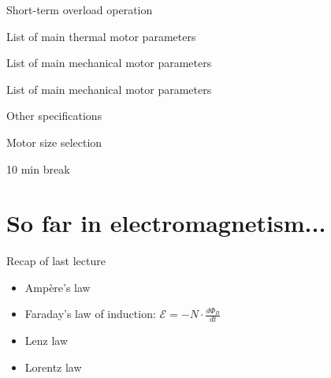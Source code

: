 \documentclass[compress]{beamer}
\makeatletter
\let\beamer@writeslidentry@miniframeson=\beamer@writeslidentry
\def\beamer@writeslidentry@miniframesoff{%
  \expandafter\beamer@ifempty\expandafter{\beamer@framestartpage}{}%
  {%
    \clearpage\beamer@notesactions%
  }
}
\newcommand*{\miniframeson}{\let\beamer@writeslidentry=\beamer@writeslidentry@miniframeson}
\newcommand*{\miniframesoff}{\let\beamer@writeslidentry=\beamer@writeslidentry@miniframesoff}
\makeatother
\begin{document}
{
    \begin{frame}{Short-term overload operation}
    \end{frame}
}

{
    \begin{frame}{List of main thermal motor parameters}
    \end{frame}
}

{
    \begin{frame}{List of main mechanical motor parameters}
    \end{frame}
}

{
    \begin{frame}{List of main mechanical motor parameters}
    \end{frame}
}

{
    \begin{frame}{Other specifications}
    \end{frame}
}


{
    \begin{frame}{Motor size selection}
    \end{frame}
}


\miniframesoff
\begin{frame}[plain]
    \begin{center}
        \Large
        10 min break\\[2em]
    \end{center}
\end{frame}
\miniframeson

\section[Recap]{So far in electromagnetism...}

\begin{frame}{Recap of last lecture}
    \begin{itemize}
        \item Ampère's law
        \item Faraday's law of induction: $\displaystyle\mathcal{E} = -N \cdot \frac{d\Phi_B}{dt}$
        \item Lenz law
        \item Lorentz law
    \end{itemize}
\end{frame}
\end{document}
